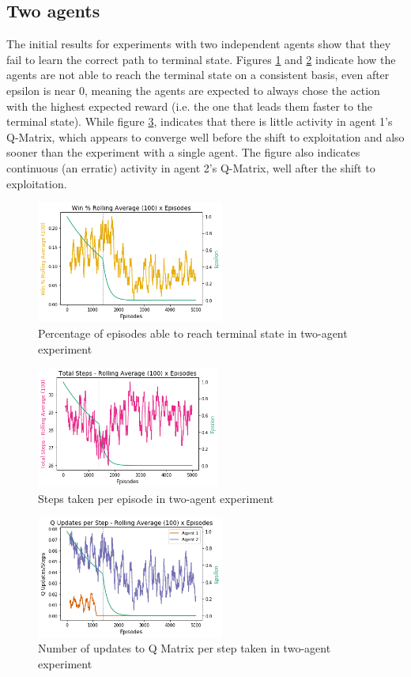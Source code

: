 \documentclass[11pt]{article}
\begin{document}
    \subsection{Two agents}
        The initial results for experiments with two independent agents show that they fail to learn the correct path to terminal state. Figures \ref{fig:exp2:win_percent} and \ref{fig:exp2:steps} indicate how the agents are not able to reach the terminal state on a consistent basis, even after epsilon is near 0, meaning the agents are expected to always chose the action with the highest expected reward (i.e. the one that leads them faster to the terminal state). While figure \ref{fig:exp2:updates}, indicates that  there is little activity in agent 1's Q-Matrix, which appears to converge well before the shift to exploitation and also sooner than the experiment with a single agent. The figure also indicates continuous (an erratic) activity in agent 2's Q-Matrix, well after the shift to exploitation.
        \begin{figure}[h]
            \includegraphics[height=4cm]{Images/exp_2/1_win_percent.png}
            \caption{Percentage of episodes able to reach terminal state in two-agent experiment}
            \label{fig:exp2:win_percent}
        \end{figure}
        \begin{figure}[h]
            \includegraphics[height=4cm]{Images/exp_2/2_total_steps.png}
            \caption{Steps taken per episode in two-agent experiment}
            \label{fig:exp2:steps}
        \end{figure}
        \begin{figure}[h]
            \includegraphics[height=4cm]{Images/exp_2/3_updates_per_step.png}
            \caption{Number of updates to Q Matrix per step taken in two-agent experiment}
            \label{fig:exp2:updates}
        \end{figure}
\end{document}
